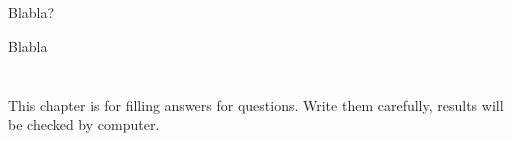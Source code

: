 \documentclass{report}
\begin{document}
\chapter{}

\begin{question}[type=exam]
Blabla?\\
\end{question}
\begin{solution}
Blabla
\end{solution}



\chapter{}
This chapter is for filling answers for questions. Write them carefully, results will be checked by computer.
\end{document}
